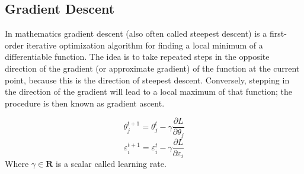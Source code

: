 \documentclass{article}
\begin{document}
\subsection{Gradient Descent}

In mathematics gradient descent (also often called steepest descent) is a first-order iterative optimization algorithm for finding a local minimum of a differentiable function. The idea is to take repeated steps in the opposite direction of the gradient (or approximate gradient) of the function at the current point, because this is the direction of steepest descent. Conversely, stepping in the direction of the gradient will lead to a local maximum of that function; the procedure is then known as gradient ascent.

$$\theta^{t+1}_{j} = \theta^{t}_{j} - \gamma \frac{\partial L}{\partial \theta_j}$$
$$\varepsilon^{t+1}_{i} = \varepsilon^{t}_{i} - \gamma \frac{\partial L}{\partial \varepsilon_i}$$
Where $\gamma \in \mathbf{R}$ is a scalar called learning rate.
\end{document}
